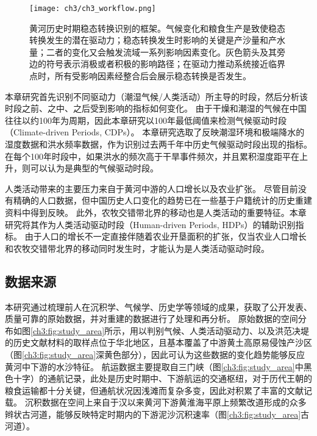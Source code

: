 \begin{figure}[!ht] %
    \centering
    \texttt{[image: ch3/ch3\_workflow.png]}
    \caption[黄河历史时期水沙特征的稳态转换识别框架]{黄河历史时期稳态转换识别的框架。气候变化和粮食生产是致使稳态转换发生的潜在驱动力；稳态转换发生时影响的关键是产沙量和产水量；二者的变化又会触发流域一系列影响因素变化。灰色箭头及其旁边的符号表示消极或者积极的影响路径；在驱动力推动系统接近临界点时，所有受影响因素经整合后会展示稳态转换是否发生。}\label{fig:ch3:regime_shift_detect}
\end{figure}


本章研究首先识别不同驱动力（潮湿气候/人类活动）所主导的时段，然后分析该时段之前、之中、之后受到影响的指标如何变化。
由于干燥和潮湿的气候在中国往往以约100年为周期\cite{GeQuanSheng2011}，因此本章研究以100年最低阈值来检测气候驱动时段（Climate-driven Periods, CDPs）。
本章研究选取了反映潮湿环境和极端降水的湿度数据和洪水频率数据\cite{GeQuanSheng2011}，作为识别过去两千年中历史气候驱动时段出现的指标。
在每个100年时段中，如果洪水的频次高于干旱事件频次，并且累积湿度距平在上升，则可以认为是典型的气候驱动时段\cite{song2020}。

人类活动带来的主要压力来自于黄河中游的人口增长以及农业扩张\cite{song2020}。
尽管目前没有精确的人口数据，但中国历史人口变化的趋势已在一些基于户籍统计的历史重建资料中得到反映。
此外，农牧交错带北界的移动也是人类活动的重要特征\cite{GeQuanSheng2011}。本章研究将其作为人类活动驱动时段（Human-driven Periods, HDPs）的辅助识别指标。
由于人口的增长不一定直接伴随着农业开垦面积的扩张，仅当农业人口增长和农牧交错带北界的移动同时发生时，才能认为是人类活动驱动时段\cite{song2020}。

\subsection{数据来源}

本研究通过梳理前人在沉积学、气候学、历史学等领域的成果，获取了公开发表、质量可靠的原始数据，并对重建的数据进行了处理和再分析。
原始数据的空间分布如图\ref{ch3:fig:study_area}所示，用以判别气候、人类活动驱动力、以及洪范决堤的历史文献材料的取样点位于华北地区，且基本覆盖了中游黄土高原易侵蚀产沙区（图\ref{ch3:fig:study_area}深黄色部分），因此可认为这些数据的变化趋势能够反应黄河中下游的水沙特征。
航运数据主要提取自三门峡（图\ref{ch3:fig:study_area}中黑色十字）的通航记录，此处是历史时期中、下游航运的交通枢纽，对于历代王朝的粮食运输都十分关键，但通航状况因浅滩而复杂多变，因此对积累了丰富的文献记载。
沉积数据在空间上来自于汉以来黄河下游黄淮海平原上频繁改道形成的众多辫状古河道\cite{shaoshixiong1989}，能够反映特定时期内的下游泥沙沉积速率（图\ref{ch3:fig:study_area}古河道）。


